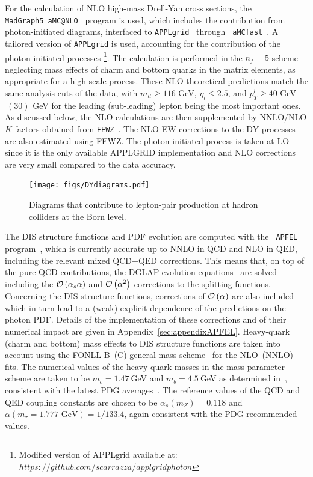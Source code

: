 For the calculation of NLO high-mass Drell-Yan cross sections, the
{\tt MadGraph5{\_}aMC@NLO}~\cite{Alwall:2014hca} program is used, which
includes the contribution from photon-initiated diagrams, interfaced
to {\tt APPLgrid}~\cite{Carli:2010rw} through {\tt
  aMCfast}~\cite{amcfast}.
%
A tailored version of {\tt APPLgrid} is used, accounting for
the contribution of the photon-initiated processes \footnote{Modified version of APPLgrid available at: $https://github.com/scarrazza/applgridphoton$}.
%
The calculation is performed in the $n_f=5$ scheme neglecting mass
effects of charm and bottom quarks in the matrix elements, as
appropriate for a high-scale process.
%
These NLO theoretical predictions match the same 
analysis cuts of the data, with $m_{ll}\ge 116$ GeV, $\eta_l\le 2.5$, and
$p_T^l \ge 40$ GeV$~(30)$ GeV for the leading (sub-leading) lepton being
the most important ones.
%
As discussed below, the NLO calculations are then supplemented by
NNLO/NLO $K$-factors obtained from {\tt FEWZ}~\cite{Gavin:2012sy}.
%
The NLO EW corrections to the DY processes are also estimated
using FEWZ. 
%
The photon-initiated process is taken at LO since it is
the only available APPLGRID implementation and NLO corrections are
very small compared to the data accuracy.
%

\begin{figure}[t]
  \begin{center}
    \texttt{[image: figs/DYdiagrams.pdf]}
    \end{center}
    \caption{Diagrams that contribute to lepton-pair production at
      hadron colliders at the Born level.}
\label{fig:photoninduced}
\end{figure}

The DIS structure functions and PDF evolution are computed with the {\tt
  APFEL} program~\cite{Bertone:2013vaa}, which is currently accurate
up to NNLO in QCD and NLO in QED, including the relevant mixed
QCD+QED corrections.
%
This means that, on top of the pure QCD
contributions, the DGLAP evolution
equations~\cite{Gribov:1972ri,Dokshitzer:1977,Altarelli:1977zs} are
solved including the $\mathcal{O}\left( \alpha_s\alpha\right)$ and
$\mathcal{O}\left( \alpha^2\right)$ corrections to the splitting functions.
%
Concerning the DIS structure functions, corrections of
$\mathcal{O}\left( \alpha\right)$ are also included which in turn lead to a (weak)
explicit dependence of the predictions on the photon PDF.
%
Details
of the implementation of these corrections and of their numerical
impact are given in Appendix~\ref{sec:appendixAPFEL}.
%
Heavy-quark (charm and bottom) mass effects to DIS structure functions
are taken into account using the FONLL-B~(C) general-mass
scheme~\cite{Forte:2010ta} for the NLO~(NNLO) fits.
%
The numerical values of the heavy-quark masses in the mass parameter 
scheme
are taken to be $m_c=1.47~$GeV and $m_b=4.5~$GeV as determined in~\cite{Abramowicz:2015mha},  
consistent with the latest PDG averages~\cite{Agashe:2014kda}.
%
The reference values of the QCD and QED coupling constants are chosen to be
$\alpha_s(m_Z)=0.118$ and $\alpha(m_\tau=1.777\mbox{ GeV})=1/133.4$, again consistent
with the PDG recommended values.

